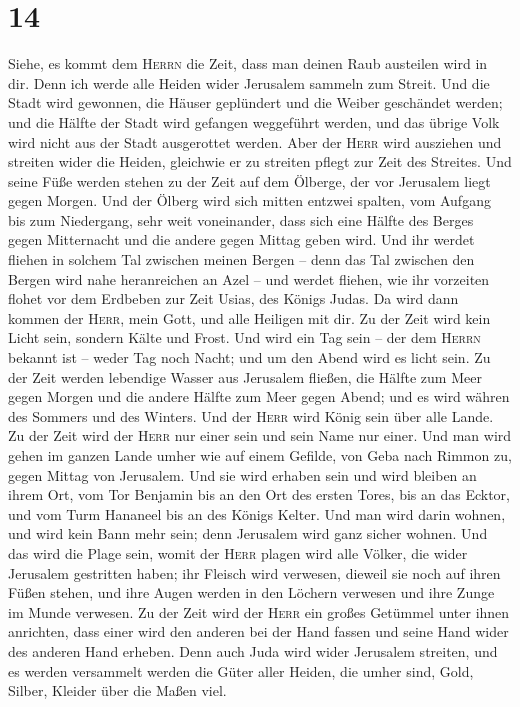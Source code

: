 \hypertarget{section-13}{%
\section{14}\label{section-13}}

 Siehe, es kommt dem \textsc{Herrn} die Zeit, dass man
deinen Raub austeilen wird in dir.  Denn ich werde alle
Heiden wider Jerusalem sammeln zum Streit. Und die Stadt wird gewonnen,
die Häuser geplündert und die Weiber geschändet werden; und die Hälfte
der Stadt wird gefangen weggeführt werden, und das übrige Volk wird
nicht aus der Stadt ausgerottet werden.  Aber der
\textsc{Herr} wird ausziehen und streiten wider die Heiden, gleichwie er
zu streiten pflegt zur Zeit des Streites.  Und seine Füße
werden stehen zu der Zeit auf dem Ölberge, der vor Jerusalem liegt gegen
Morgen. Und der Ölberg wird sich mitten entzwei spalten, vom Aufgang bis
zum Niedergang, sehr weit voneinander, dass sich eine Hälfte des Berges
gegen Mitternacht und die andere gegen Mittag geben wird. 
Und ihr werdet fliehen in solchem Tal zwischen meinen Bergen -- denn das
Tal zwischen den Bergen wird nahe heranreichen an Azel -- und werdet
fliehen, wie ihr vorzeiten flohet vor dem Erdbeben zur Zeit Usias, des
Königs Judas. Da wird dann kommen der \textsc{Herr}, mein Gott, und alle
Heiligen mit dir.  Zu der Zeit wird kein Licht sein,
sondern Kälte und Frost.  Und wird ein Tag sein -- der dem
\textsc{Herrn} bekannt ist -- weder Tag noch Nacht; und um den Abend
wird es licht sein.  Zu der Zeit werden lebendige Wasser
aus Jerusalem fließen, die Hälfte zum Meer gegen Morgen und die andere
Hälfte zum Meer gegen Abend; und es wird währen des Sommers und des
Winters.  Und der \textsc{Herr} wird König sein über alle
Lande. Zu der Zeit wird der \textsc{Herr} nur einer sein und sein Name
nur einer.  Und man wird gehen im ganzen Lande umher wie
auf einem Gefilde, von Geba nach Rimmon zu, gegen Mittag von Jerusalem.
Und sie wird erhaben sein und wird bleiben an ihrem Ort, vom Tor
Benjamin bis an den Ort des ersten Tores, bis an das Ecktor, und vom
Turm Hananeel bis an des Königs Kelter.  Und man wird
darin wohnen, und wird kein Bann mehr sein; denn Jerusalem wird ganz
sicher wohnen.  Und das wird die Plage sein, womit der
\textsc{Herr} plagen wird alle Völker, die wider Jerusalem gestritten
haben; ihr Fleisch wird verwesen, dieweil sie noch auf ihren Füßen
stehen, und ihre Augen werden in den Löchern verwesen und ihre Zunge im
Munde verwesen.  Zu der Zeit wird der \textsc{Herr} ein
großes Getümmel unter ihnen anrichten, dass einer wird den anderen bei
der Hand fassen und seine Hand wider des anderen Hand erheben.
 Denn auch Juda wird wider Jerusalem streiten, und es
werden versammelt werden die Güter aller Heiden, die umher sind, Gold,
Silber, Kleider über die Maßen viel.

